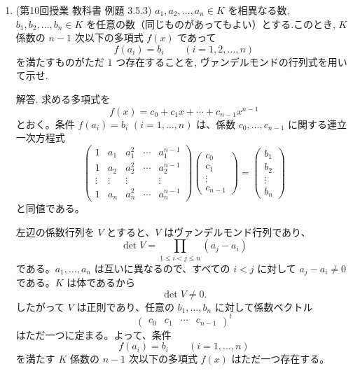 \documentclass[dvipdfmx,a4paper,11pt]{article} %
\theoremstyle{definition}
\begin{document}
\begin{enumerate}[label=\textbf{問題}\arabic*.]
\item (第10回授業 教科書 例題 3.5.3) 
$a_1,a_2,\ldots,a_n\in K$ を相異なる数, $b_1,b_2,\ldots,b_n\in K$ を任意の数（同じものがあってもよい）とする.このとき, $K$ 係数の $n-1$ 次以下の多項式 $f(x)$ であって
\[
f(a_i)=b_i
\qquad
(i=1,2,\ldots,n)
\]
を満たすものがただ $1$ つ存在することを, ヴァンデルモンドの行列式を用いて示せ.

解答.
求める多項式を
\[
f(x)=c_0+c_1x+\cdots+c_{n-1}x^{n-1}
\]
とおく。条件 $f(a_i)=b_i$ $(i=1,\ldots,n)$ は、係数 $c_0,\ldots,c_{n-1}$ に関する連立一次方程式
\[
\begin{pmatrix}
1&a_1&a_1^2&\cdots&a_1^{n-1}\\
1&a_2&a_2^2&\cdots&a_2^{n-1}\\
\vdots&\vdots&\vdots&&\vdots\\
1&a_n&a_n^2&\cdots&a_n^{n-1}
\end{pmatrix}
\begin{pmatrix}
c_0\\c_1\\\vdots\\c_{n-1}
\end{pmatrix}
=
\begin{pmatrix}
b_1\\b_2\\\vdots\\b_n
\end{pmatrix}
\]
と同値である。

左辺の係数行列を $V$ とすると、$V$ はヴァンデルモンド行列であり、
\[
\det V
=\prod_{1\leq i<j\leq n}(a_j-a_i)
\]
である。$a_1,\ldots,a_n$ は互いに異なるので、すべての $i<j$ に対して $a_j-a_i\neq0$ である。$K$ は体であるから
\[
\det V\neq0.
\]
したがって $V$ は正則であり、任意の $b_1,\ldots,b_n$ に対して係数ベクトル
\[
\begin{pmatrix}
c_0&c_1&\cdots&c_{n-1}
\end{pmatrix}^{t}
\]
はただ一つに定まる。よって、条件
\[
f(a_i)=b_i\qquad(i=1,\ldots,n)
\]
を満たす $K$ 係数の $n-1$ 次以下の多項式 $f(x)$ はただ一つ存在する。

\end{enumerate}
\end{document}
